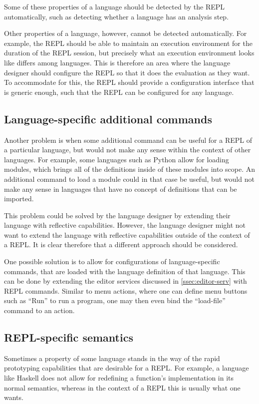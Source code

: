 Some of these properties of a language should be detected by the REPL
automatically, such as detecting whether a language has an analysis
step.

Other properties of a language, however, cannot be detected
automatically. For example, the REPL should be able to maintain an
execution environment for the duration of the REPL session, but
precisely what an execution environment looks like differs among
languages. This is therefore an area where the language designer
should configure the REPL so that it does the evaluation as they
want. To accommodate for this, the REPL should provide a configuration
interface that is generic enough, such that the REPL can be configured
for any language.

\subsection{Language-specific additional commands}
\label{ssec:lang-spec-addit}
Another problem is when some additional command can be useful for a
REPL of a particular language, but would not make any sense within the
context of other languages. For example, some languages such as Python
allow for loading modules, which brings all of the definitions inside
of these modules into scope. An additional command to load a module
could in that case be useful, but would not make any sense in
languages that have no concept of definitions that can be imported.

This problem could be solved by the language designer by extending
their language with reflective capabilities. However, the language
designer might not want to extend the language with reflective
capabilities outside of the context of a REPL. It is clear therefore
that a different approach should be considered.

One possible solution is to allow for configurations of
language-specific commands, that are loaded with the language
definition of that language. This can be done by extending the editor
services discussed in \cref{ssec:editor-serv} with REPL
commands. Similar to menu actions, where one can define menu buttons
such as ``Run'' to run a program, one may then even bind the
``load-file'' command to an action.

\subsection{REPL-specific semantics}
\label{ssec:repl-spec-semant}
Sometimes a property of some language stands in the way of the rapid
prototyping capabilities that are desirable for a REPL. For example, a
language like Haskell does not allow for redefining a function's
implementation in its normal semantics, whereas in the context of a
REPL this is usually what one wants.

